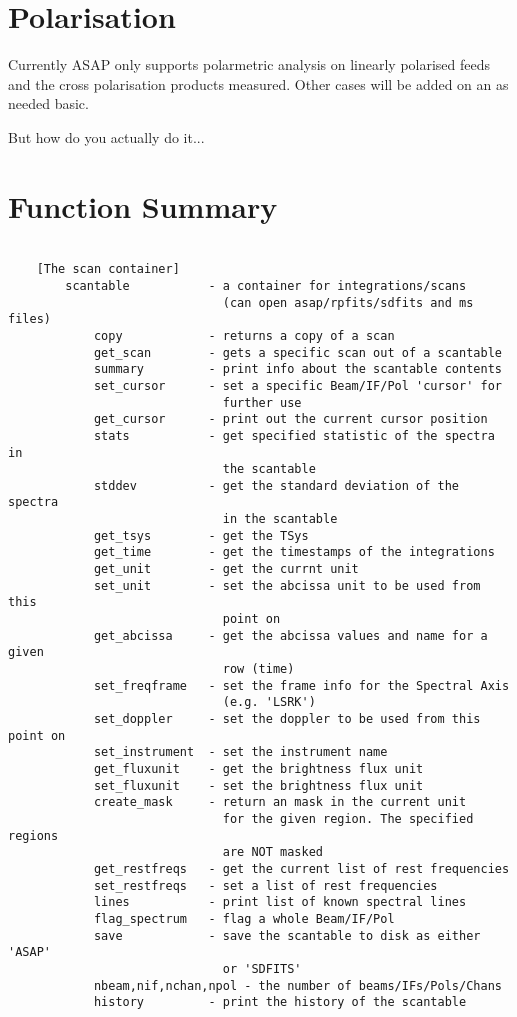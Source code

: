 \documentclass[11pt]{article}
\begin{document}
\section{Polarisation}

Currently ASAP only supports polarmetric analysis on linearly
polarised feeds and the cross polarisation products measured. Other
cases will be added on an as needed basic.

But how do you actually do it...

\section{Function Summary}

\begin{verbatim}

    [The scan container]
        scantable           - a container for integrations/scans
                              (can open asap/rpfits/sdfits and ms files)
            copy            - returns a copy of a scan
            get_scan        - gets a specific scan out of a scantable
            summary         - print info about the scantable contents
            set_cursor      - set a specific Beam/IF/Pol 'cursor' for
                              further use
            get_cursor      - print out the current cursor position
            stats           - get specified statistic of the spectra in
                              the scantable
            stddev          - get the standard deviation of the spectra
                              in the scantable
            get_tsys        - get the TSys
            get_time        - get the timestamps of the integrations
            get_unit        - get the currnt unit
            set_unit        - set the abcissa unit to be used from this
                              point on
            get_abcissa     - get the abcissa values and name for a given
                              row (time)
            set_freqframe   - set the frame info for the Spectral Axis
                              (e.g. 'LSRK')
            set_doppler     - set the doppler to be used from this point on
            set_instrument  - set the instrument name
            get_fluxunit    - get the brightness flux unit
            set_fluxunit    - set the brightness flux unit
            create_mask     - return an mask in the current unit
                              for the given region. The specified regions
                              are NOT masked
            get_restfreqs   - get the current list of rest frequencies
            set_restfreqs   - set a list of rest frequencies
            lines           - print list of known spectral lines
            flag_spectrum   - flag a whole Beam/IF/Pol
            save            - save the scantable to disk as either 'ASAP'
                              or 'SDFITS'
            nbeam,nif,nchan,npol - the number of beams/IFs/Pols/Chans
            history         - print the history of the scantable


\end{verbatim}
\end{document}
